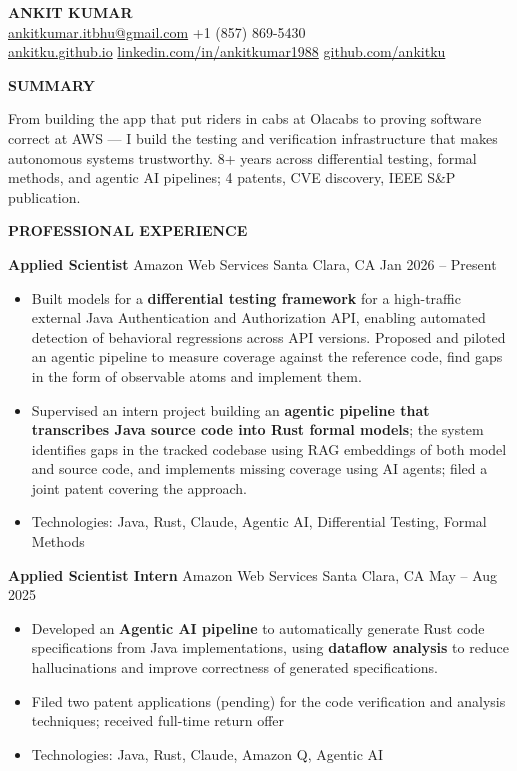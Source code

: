 \documentclass[11pt,letterpaper]{article}
\newcommand{\cvsection}[1]{
    \vspace{0.6em} {\color{darkblue}\textbf{\Large #1}}
    \vspace{0.15em} \textcolor{lightblue}{\hrulefill}
    \vspace{0.4em} }
\newcommand{\cvsubsection}[4]{ \textbf{#1} \textcolor{mediumgray}{\textbullet}
  #2 \textcolor{mediumgray}{\textbullet} #3 \textcolor{mediumgray}{\textbullet} #4 }
\begin{document}
\begin{center}
    {\Huge \textbf{\color{darkblue}ANKIT KUMAR}} \\
    \vspace{0.4em} \large
    \href{mailto:ankitkumar.itbhu@gmail.com}{ankitkumar.itbhu@gmail.com}
    \textcolor{mediumgray}{\textbullet} +1 (857) 869-5430 \\
    \vspace{0.1em} \href{https://ankitku.github.io}{ankitku.github.io}
    \textcolor{mediumgray}{\textbullet}
    \href{https://linkedin.com/in/ankitkumar1988}{linkedin.com/in/ankitkumar1988}
    \textcolor{mediumgray}{\textbullet}
    \href{https://github.com/ankitku}{github.com/ankitku}
\end{center}

\cvsection{SUMMARY}

\normalsize From building the app that put riders in cabs at Olacabs to proving software correct at AWS --- I build the testing and verification infrastructure that makes autonomous systems trustworthy. 8+ years across differential testing, formal methods, and agentic AI pipelines; 4 patents, CVE discovery, IEEE S\&P publication.

\cvsection{PROFESSIONAL EXPERIENCE}

\cvsubsection{Applied Scientist}{Amazon Web Services}{Santa Clara,
  CA}{Jan 2026 -- Present}
\begin{itemize}
    \item Built models for a \textbf{differential testing framework}
      for a high-traffic external Java Authentication and
      Authorization API, enabling automated detection of behavioral
      regressions across API versions. Proposed and piloted an agentic
      pipeline to measure coverage against the reference code, find
      gaps in the form of observable atoms and implement them.
    \item Supervised an intern project building an \textbf{agentic
      pipeline that transcribes Java source code into Rust formal
      models}; the system identifies gaps in the tracked codebase
      using RAG embeddings of both model and source code, and
      implements missing coverage using AI agents; filed a joint
      patent covering the approach.
    \item Technologies: Java, Rust, Claude, Agentic AI, Differential Testing,
      Formal Methods
\end{itemize}

\cvsubsection{Applied Scientist Intern}{Amazon Web Services}{Santa
  Clara, CA}{May -- Aug 2025}
\begin{itemize}
    \item Developed an \textbf{Agentic AI pipeline} to automatically
      generate Rust code specifications from Java implementations,
      using \textbf{dataflow analysis} to reduce hallucinations
      and improve correctness of generated specifications.
    \item Filed two patent applications (pending) for the code
      verification and analysis techniques; received full-time return
      offer
    \item Technologies: Java, Rust, Claude, Amazon Q, Agentic AI
\end{itemize}
\end{document}
